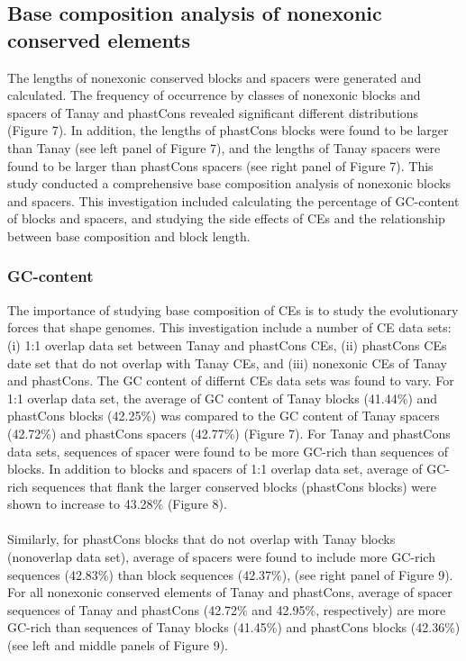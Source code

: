 \documentclass[12pt]{report}
\begin{document}
\subsection{Base composition analysis of nonexonic conserved elements}
The lengths of nonexonic conserved blocks and spacers were generated and calculated. The frequency of occurrence by classes of nonexonic blocks and spacers of Tanay and phastCons revealed significant different distributions (Figure 7). In addition, the lengths of phastCons blocks were found to be larger than Tanay (see left panel of Figure 7), and the lengths of Tanay spacers were found to be larger than phastCons spacers (see right panel of Figure 7). This study conducted a comprehensive base composition analysis of nonexonic blocks and spacers. This investigation included calculating the percentage of GC-content of blocks and spacers, and studying the side effects of CEs and the relationship between base composition and block length.

\subsubsection{GC-content}
The importance of studying base composition of CEs is to study the evolutionary forces that shape genomes. This investigation include a number of CE data sets: (i) 1:1 overlap data set between Tanay and phastCons CEs, (ii) phastCons CEs date set that do not overlap with Tanay CEs, and (iii) nonexonic CEs of Tanay and phastCons. The GC content of differnt CEs data sets was found to vary. For 1:1 overlap data set, the average of GC content of Tanay blocks (41.44\%) and phastCons blocks (42.25\%) was compared to the GC content of Tanay spacers (42.72\%) and phastCons spacers (42.77\%) (Figure 7). For Tanay and phastCons data sets, sequences of spacer were found to be more GC-rich than sequences of blocks. In addition to blocks and spacers of 1:1 overlap data set, average of GC-rich sequences that flank the larger conserved blocks (phastCons blocks) were shown to increase to 43.28\% (Figure 8).\\\\  
Similarly, for phastCons blocks that do not overlap with Tanay blocks (nonoverlap data set), average of spacers were found to include more GC-rich sequences (42.83\%) than block sequences (42.37\%), (see right panel of Figure 9). For all nonexonic conserved elements of Tanay and phastCons, average of spacer sequences of Tanay and phastCons (42.72\% and 42.95\%, respectively) are more GC-rich than sequences of Tanay blocks (41.45\%) and phastCons blocks (42.36\%) (see left and middle panels of Figure 9).\\
\end{document}
